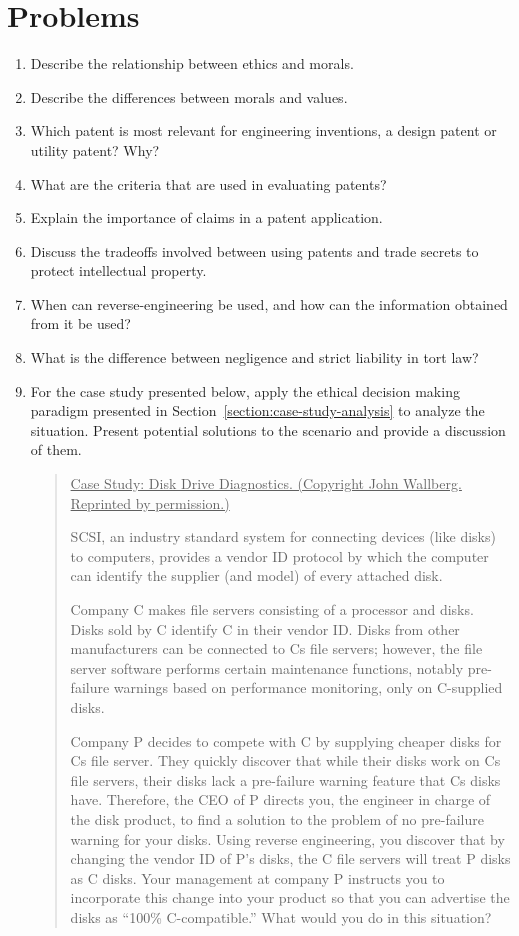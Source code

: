 \chapter{Problems}


\begin{enumerate}
\def\labelenumi{\arabic{enumi}.}
\item
  Describe the relationship between ethics and morals.
\item
  Describe the differences between morals and values.
\item
  Which patent is most relevant for engineering inventions, a design
  patent or utility patent? Why?
\item
  What are the criteria that are used in evaluating patents?
\item
  Explain the importance of claims in a patent application.
\item
  Discuss the tradeoffs involved between using patents and trade secrets
  to protect intellectual property.
\item
  When can reverse-engineering be used, and how can the information
  obtained from it be used?
\item
  What is the difference between negligence and strict liability in tort
  law?
\item
  For the case study presented below, apply the ethical decision making
  paradigm presented in Section~\ref{section:case-study-analysis} to 
analyze the situation. Present
  potential solutions to the scenario and provide a discussion of them.

\begin{quote}
\ul{\hfill\break
Case Study: Disk Drive Diagnostics. (Copyright John Wallberg. Reprinted
by permission.)}

SCSI, an industry standard system for connecting devices (like disks) to
computers, provides a vendor ID protocol by which the computer can
identify the supplier (and model) of every attached disk.

Company C makes file servers consisting of a processor and disks. Disks
sold by C identify C in their vendor ID. Disks from other manufacturers
can be connected to C\textquotesingle s file servers; however, the file
server software performs certain maintenance functions, notably
pre-failure warnings based on performance monitoring, only on C-supplied
disks.

Company P decides to compete with C by supplying cheaper disks for
C\textquotesingle s file server. They quickly discover that while their
disks work on C\textquotesingle s file servers, their disks lack a
pre-failure warning feature that C\textquotesingle s disks have.
Therefore, the CEO of P directs you, the engineer in charge of the disk
product, to find a solution to the problem of no pre-failure warning for
your disks. Using reverse engineering, you discover that by changing the
vendor ID of P's disks, the C file servers will treat P disks as C
disks. Your management at company P instructs you to incorporate this
change into your product so that you can advertise the disks as ``100\%
C-compatible.'' What would you do in this situation?
\end{quote}



\end{enumerate}

